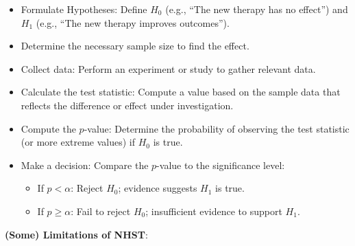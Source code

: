 \documentclass[
]{book}
\providecommand{\tightlist}{%
  \setlength{\itemsep}{0pt}\setlength{\parskip}{0pt}}
\begin{document}
\begin{itemize}
\item
  Formulate Hypotheses: Define \(H_0\) (e.g., ``The new therapy has no effect'')
  and \(H_1\) (e.g., ``The new therapy improves outcomes'').
\item
  Determine the necessary sample size to find the effect.
\item
  Collect data: Perform an experiment or study to gather relevant data.
\item
  Calculate the test statistic: Compute a value based on the sample data that
  reflects the difference or effect under investigation.
\item
  Compute the \(p\)-value: Determine the probability of observing the
  test statistic (or more extreme values) if \(H_0\) is true.
\item
  Make a decision: Compare the \(p\)-value to the significance level:

  \begin{itemize}
  \tightlist
  \item
    If \(p < \alpha\): Reject \(H_0\); evidence suggests \(H_1\) is true.
  \item
    If \(p \ge \alpha\): Fail to reject \(H_0\); insufficient evidence to support \(H_1\).
  \end{itemize}
\end{itemize}

\textbf{(Some) Limitations of NHST}:
\end{document}

